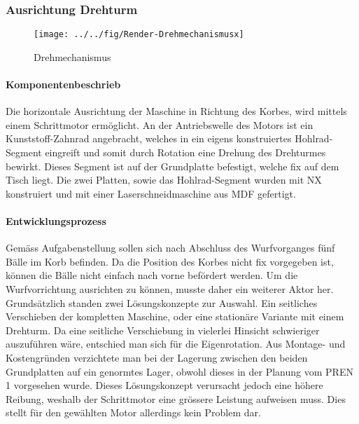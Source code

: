 \subsubsection{Ausrichtung Drehturm}
\begin{figure}[h!]
	\centering
		\texttt{[image: ../../fig/Render-Drehmechanismusx]}
	\caption{Drehmechanismus}
	\label{fig:Drehmechanismus}
\end{figure}
\paragraph{Komponentenbeschrieb\\}
Die horizontale Ausrichtung der Maschine in Richtung des Korbes, wird mittels einem Schrittmotor ermöglicht. An der Antriebswelle des Motors ist ein Kunststoff-Zahnrad angebracht, welches in ein eigens konstruiertes Hohlrad-Segment eingreift und somit durch Rotation eine Drehung des Drehturmes bewirkt. Dieses Segment ist auf der Grundplatte befestigt, welche fix auf dem Tisch liegt. Die zwei Platten, sowie das Hohlrad-Segment wurden mit NX konstruiert und mit einer Laserschneidmaschine aus MDF gefertigt.

\paragraph{Entwicklungsprozess\\}
Gemäss Aufgabenstellung sollen sich nach Abschluss des Wurfvorganges fünf Bälle im Korb befinden. Da die Position des Korbes nicht fix vorgegeben ist, können die Bälle nicht einfach nach vorne befördert werden. Um die Wurfvorrichtung ausrichten zu können, musste daher ein weiterer Aktor her. Grundsätzlich standen zwei Lösungskonzepte zur Auswahl. Ein seitliches Verschieben der kompletten Maschine, oder eine stationäre Variante mit einem Drehturm. Da eine seitliche Verschiebung in vielerlei Hinsicht schwieriger auszuführen wäre, entschied man sich für die Eigenrotation. Aus Montage- und Kostengründen verzichtete man bei der Lagerung zwischen den beiden Grundplatten auf ein genormtes Lager, obwohl dieses in der Planung vom PREN 1 vorgesehen wurde. Dieses Lösungskonzept verursacht jedoch eine höhere Reibung, weshalb der Schrittmotor eine grössere Leistung aufweisen muss. Dies stellt für den gewählten Motor allerdings kein Problem dar.